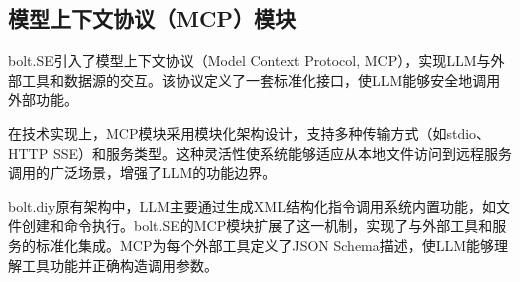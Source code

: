 \subsection{模型上下文协议（MCP）模块}

bolt.SE引入了模型上下文协议（Model Context Protocol, MCP），实现LLM与外部工具和数据源的交互。该协议定义了一套标准化接口，使LLM能够安全地调用外部功能。

在技术实现上，MCP模块采用模块化架构设计，支持多种传输方式（如stdio、HTTP SSE）和服务类型。这种灵活性使系统能够适应从本地文件访问到远程服务调用的广泛场景，增强了LLM的功能边界。

bolt.diy原有架构中，LLM主要通过生成XML结构化指令调用系统内置功能，如文件创建和命令执行。bolt.SE的MCP模块扩展了这一机制，实现了与外部工具和服务的标准化集成。MCP为每个外部工具定义了JSON Schema描述，使LLM能够理解工具功能并正确构造调用参数。

